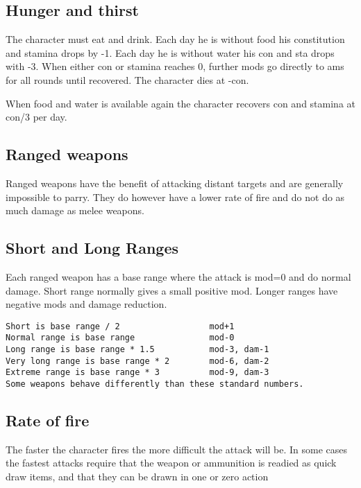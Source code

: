 \subsection*{Hunger and thirst}
The character must eat and drink. Each day he is without food his constitution and stamina drops by -1. Each day he is without water his con and sta drops with -3. When either con or stamina reaches 0, further mods go directly to ams for all rounds until recovered. The character dies at -con.

When food and water is available again the character recovers con and stamina at con/3 per day.










\subsection*{Ranged weapons}
Ranged weapons have the benefit of attacking distant targets and are generally impossible to parry. They do however have a lower rate of fire and do not do as much damage as melee weapons.


\subsection*{Short and Long Ranges}
Each ranged weapon has a base range where the attack is mod=0 and do normal damage. Short range normally gives a small positive mod. Longer ranges have negative mods and damage reduction.
\small \begin{verbatim}
Short is base range / 2                  mod+1
Normal range is base range               mod-0
Long range is base range * 1.5           mod-3, dam-1
Very long range is base range * 2        mod-6, dam-2
Extreme range is base range * 3          mod-9, dam-3
Some weapons behave differently than these standard numbers.
\end{verbatim} \normalsize


\subsection*{Rate of fire}
The faster the character fires the more difficult the attack will be. In some cases the fastest attacks require that the weapon or ammunition is readied as quick draw items, and that they can be drawn in one or zero action


